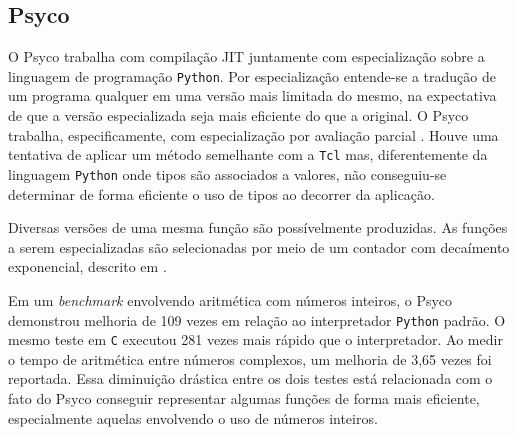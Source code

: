 \subsection{Psyco}

O Psyco \cite{psyco} trabalha com compilação JIT juntamente com
especialização sobre a linguagem de programação \texttt{Python}.
Por especialização entende-se a tradução de um programa qualquer em
uma versão mais limitada do mesmo, na expectativa de que a versão
especializada seja mais eficiente do que a original. O Psyco trabalha,
especificamente, com especialização por avaliação parcial
\cite{partialeval}. Houve uma tentativa de aplicar um método
semelhante com a \texttt{Tcl} mas, diferentemente da linguagem
\texttt{Python} onde tipos são associados a valores, não conseguiu-se
determinar de forma eficiente o uso de tipos ao decorrer da aplicação.

Diversas versões de uma mesma função são possívelmente produzidas.
As funções a serem especializadas são selecionadas por meio de um
contador com decaímento exponencial, descrito em \cite{holzle}.

Em um \textit{benchmark} envolvendo aritmética com números inteiros, o
Psyco demonstrou melhoria de 109 vezes em relação ao interpretador
\texttt{Python} padrão. O mesmo teste em \texttt{C} executou 281 vezes
mais rápido que o interpretador. Ao medir o tempo de aritmética entre
números complexos, um melhoria de 3,65 vezes foi reportada. Essa
diminuição drástica entre os dois testes está relacionada com o fato
do Psyco conseguir representar algumas funções de forma mais
eficiente, especialmente aquelas envolvendo o uso de números inteiros.

